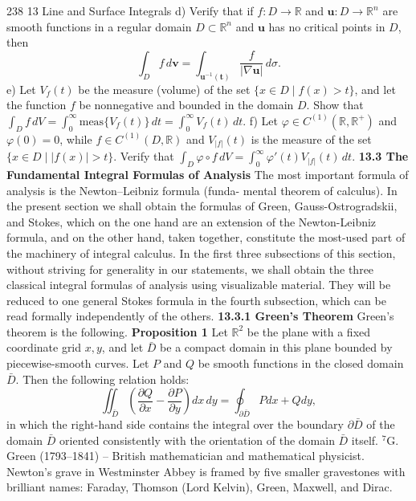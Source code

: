 238 \hfill 13 Line and Surface Integrals
\vspace{12pt}
d) Verify that if $f : D \to \mathbb{R}$ and $\mathbf{u} : D \to \mathbb{R}^n$ are smooth functions in a regular
domain $D \subset \mathbb{R}^n$ and $\mathbf{u}$ has no critical points in $D$, then
\[ \int_{D} f \, d\mathbf{v} = \int_{\mathbf{u}^{-1}(\mathbf{t})} \frac{f}{|\nabla \mathbf{u}|} \, d\sigma. \]
e) Let $V_f(t)$ be the measure (volume) of the set $\{x \in D \mid f(x) > t\}$, and let the
function $f$ be nonnegative and bounded in the domain $D$.
Show that $\int_D f \, dV = \int_0^\infty \text{meas} \{V_f(t)\} \, dt = \int_0^\infty V_f(t) \, dt$.
f) Let $\varphi \in C^{(1)}(\mathbb{R}, \mathbb{R}^+)$ and $\varphi(0) = 0$, while $f \in C^{(1)}(D, \mathbb{R})$ and $V_{|f|}(t)$
is the measure of the set $\{x \in D \mid |f(x)| > t\}$. Verify that $\int_D \varphi \circ f \, dV =
\int_0^\infty \varphi'(t) V_{|f|}(t) \, dt$.
\vspace{12pt}
\noindent \textbf{13.3 The Fundamental Integral Formulas of Analysis}
\vspace{12pt}
The most important formula of analysis is the Newton–Leibniz formula (funda-
mental theorem of calculus). In the present section we shall obtain the formulas of
Green, Gauss-Ostrogradskii, and Stokes, which on the one hand are an extension of
the Newton-Leibniz formula, and on the other hand, taken together, constitute the
most-used part of the machinery of integral calculus.
In the first three subsections of this section, without striving for generality in our
statements, we shall obtain the three classical integral formulas of analysis using
visualizable material. They will be reduced to one general Stokes formula in the
fourth subsection, which can be read formally independently of the others.
\vspace{12pt}
\noindent \textbf{13.3.1 Green's Theorem}
\vspace{12pt}
Green's theorem is the following.
\vspace{12pt}
\noindent \textbf{Proposition 1} Let $\mathbb{R}^2$ be the plane with a fixed coordinate grid $x, y$, and let $\bar{D}$ be
a compact domain in this plane bounded by piecewise-smooth curves. Let $P$ and $Q$
be smooth functions in the closed domain $\bar{D}$. Then the following relation holds:
\[ \iint_{\bar{D}} \left( \frac{\partial Q}{\partial x} - \frac{\partial P}{\partial y} \right) dx \, dy = \oint_{\partial \bar{D}} P dx + Q dy, \tag{13.25} \]
in which the right-hand side contains the integral over the boundary $\partial \bar{D}$ of the
domain $\bar{D}$ oriented consistently with the orientation of the domain $\bar{D}$ itself.
\vspace{12pt}
\noindent $^7$G. Green (1793–1841) – British mathematician and mathematical physicist. Newton's grave in
Westminster Abbey is framed by five smaller gravestones with brilliant names: Faraday, Thomson
(Lord Kelvin), Green, Maxwell, and Dirac.